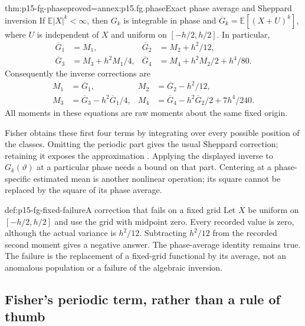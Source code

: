 \begin{hbtheorem}{thm:p15-fg-phase}{proved=annex:p15.fg.phase}{Exact phase average and Sheppard inversion}
If \(\mathbb E|X|^k<\infty\), then \(G_k\) is integrable in phase and
\(\overline G_k=\mathbb E[(X+U)^k]\), where \(U\) is independent of
\(X\) and uniform on \([-h/2,h/2]\). In particular,
\[
\begin{aligned}
 \overline G_1&=M_1,&
 \overline G_2&=M_2+h^2/12,\\
 \overline G_3&=M_3+h^2M_1/4,&
 \overline G_4&=M_4+h^2M_2/2+h^4/80.
\end{aligned}
\]
Consequently the inverse corrections are
\[
\begin{aligned}
 M_1&=\overline G_1,& M_2&=\overline G_2-h^2/12,\\
 M_3&=\overline G_3-h^2\overline G_1/4,&
 M_4&=\overline G_4-h^2\overline G_2/2+7h^4/240.
\end{aligned}
\]
All moments in these equations are raw moments about the same fixed origin.
\end{hbtheorem}

Fisher obtains these first four terms by integrating over every possible
position of the classes. Omitting the periodic part gives the usual
Sheppard correction; retaining it exposes the approximation
\cite[pp.~318--319]{Fisher1922Foundations}. Applying the displayed inverse
to \(G_k(\vartheta)\) at a particular phase needs a bound on that part.
Centering at a phase-specific estimated mean is another nonlinear operation;
its square cannot be replaced by the square of its phase average.

\begin{hbexample}{def:p15-fg-fixed-failure}{A correction that fails on a fixed grid}
Let \(X\) be uniform on \([-h/2,h/2]\) and use the grid with midpoint zero.
Every recorded value is zero, although the actual variance is \(h^2/12\).
Subtracting \(h^2/12\) from the recorded second moment gives a negative
answer. The phase-average identity remains true. The failure is the
replacement of a fixed-grid functional by its average, not an anomalous
population or a failure of the algebraic inversion.
\end{hbexample}

\subsection{Fisher's periodic term, rather than a rule of thumb}

